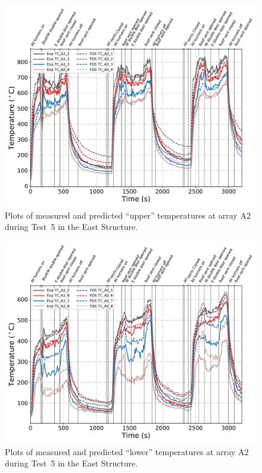 \clearpage
\begin{figure}[p]
	\centering
	\includegraphics[width=\columnwidth]{Figures/Plots/Validation/Temperature/Test_5_TC_A2_upper}
	\caption{Plots of measured and predicted ``upper'' temperatures at array A2 during Test~5 in the East Structure.}
	\label{fig:TCA2_upper_data_Test5}
\end{figure}
\begin{figure}[p]
	\centering
	\includegraphics[width=\columnwidth]{Figures/Plots/Validation/Temperature/Test_5_TC_A2_lower}
	\caption{Plots of measured and predicted ``lower'' temperatures at array A2 during Test~5 in the East Structure.}
	\label{fig:TCA2_lower_data_Test5}
\end{figure}

